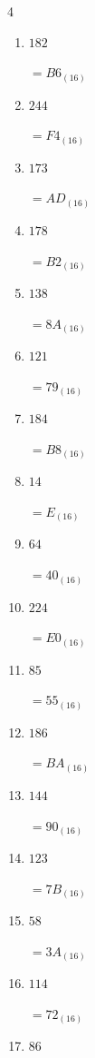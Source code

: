 \begin{multicols}{4}
\begin{enumerate}
  \item $182$

        $=B6_{(16)}$

  \item $244$

        $=F4_{(16)}$

  \item $173$

        $=AD_{(16)}$

\columnbreak %

  \item $178$

        $=B2_{(16)}$

  \item $138$

        $=8A_{(16)}$

  \item $121$

        $=79_{(16)}$

  \item $184$

        $=B8_{(16)}$

  \item $14$

        $=E_{(16)}$

  \item $64$

        $=40_{(16)}$

  \item $224$

        $=E0_{(16)}$

  \item $85$

        $=55_{(16)}$

  \item $186$

        $=BA_{(16)}$

  \item $144$

        $=90_{(16)}$

  \item $123$

        $=7B_{(16)}$

  \item $58$

        $=3A_{(16)}$

  \item $114$

        $=72_{(16)}$

  \item $86$


\end{enumerate}
\end{multicols}
